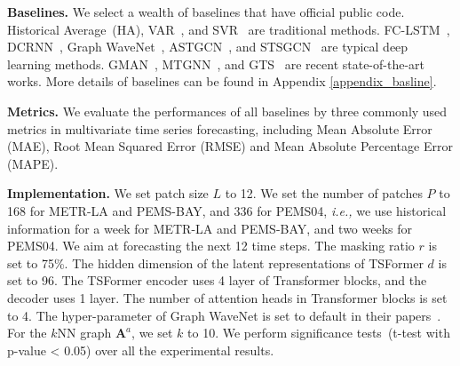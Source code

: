 \documentclass[sigconf]{acmart}
\newcommand{\ie}{\textit{i.e.,}\xspace}
\begin{document}
\begin{table}
\setlength{\abovecaptionskip}{0.cm}
\caption{Statistics of datasets.}
\label{tab:datasets}
  \vspace{-0.3cm}
\end{table} 
\noindent\textbf{Baselines.} We select a wealth of baselines that have official public code.
Historical Average~(HA), VAR~\cite{VAR}, and SVR~\cite{SVR} are traditional methods.
FC-LSTM~\cite{2014Seq2Seq}, DCRNN~\cite{2017DCRNN}, Graph WaveNet~\cite{GWNet}, ASTGCN~\cite{2019ASTGCN}, and STSGCN~\cite{2020STSGCN} are typical deep learning methods. GMAN~\cite{2020GMAN}, MTGNN~\cite{2020MTGNN}, and GTS~\cite{2021GTS} are recent state-of-the-art works.
More details of baselines can be found in Appendix \ref{appendix_basline}.

\noindent\textbf{Metrics.}
We evaluate the performances of all baselines by three commonly used metrics in multivariate time series forecasting, including Mean Absolute Error (MAE), Root Mean Squared Error (RMSE) and Mean Absolute Percentage Error (MAPE).

\noindent\textbf{Implementation.}
We set patch size $L$ to 12.
We set the number of patches $P$ to 168 for METR-LA and PEMS-BAY, and 336 for PEMS04, \ie we use historical information for a week for METR-LA and PEMS-BAY, and two weeks for PEMS04.
We aim at forecasting the next 12 time steps.
The masking ratio $r$ is set to 75\%.
The hidden dimension of the latent representations of TSFormer $d$ is set to 96.
The TSFormer encoder uses 4 layer of Transformer blocks, and the decoder uses 1 layer.
The number of attention heads in Transformer blocks is set to 4.
The hyper-parameter of Graph WaveNet is set to default in their papers~\cite{GWNet}.
For the $k$NN graph $\mathbf{A}^a$, we set $k$ to 10.
We perform significance tests~(t-test with p-value < 0.05) over all the experimental results.
\end{document}
